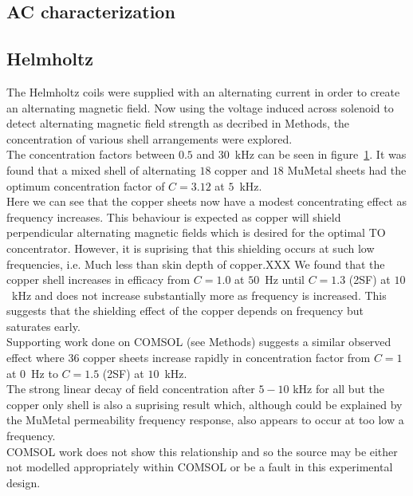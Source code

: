 \documentclass[11pt]{iopart}
\begin{document}
\subsection{AC characterization}
\begin{figure}
  \caption{}
  \label{fig:AC_helm_graph}
\end{figure}

\subsection{Helmholtz}
The Helmholtz coils were supplied with an alternating current in order
to create an alternating magnetic field.  Now using the voltage
induced across solenoid to detect alternating magnetic field strength
as decribed in Methods, the concentration of various shell
arrangements were explored.\\

The concentration factors between $0.5$ and $30$~kHz can be seen in
figure~\ref{fig:AC_helm_graph}. It was found that a mixed shell of
alternating $18$ copper and $18$ MuMetal sheets had the optimum
concentration factor of $C = 3.12$ at $5$~kHz.\\ Here we can see that
the copper sheets now have a modest concentrating effect as frequency
increases. This behaviour is expected as copper will shield
perpendicular alternating magnetic fields which is desired for the
optimal TO concentrator. However, it is suprising that this shielding
occurs at such low frequencies, i.e. Much less than skin depth of
copper.XXX
We found that the copper shell increases in efficacy from $C = 1.0$ at
$50$~Hz until $C = 1.3$ (2SF) at $10$~kHz and does not increase
substantially more as frequency is increased. This suggests that the
shielding effect of the copper depends on frequency but saturates
early.\\ Supporting work done on COMSOL (see Methods) suggests a similar observed
effect where 36 copper sheets increase rapidly in concentration factor
from $C = 1$ at $0$~Hz to $C = 1.5$ (2SF) at $10$~kHz.\\

The strong linear decay of field concentration after $5-10$ kHz for
all but the copper only shell is also a suprising result which,
although could be explained by the MuMetal permeability frequency
response, also appears to occur at too low a frequency.\\ COMSOL work
does not show this relationship and so the source may be either not
modelled appropriately within COMSOL or be a fault in this
experimental design.\\
\end{document}
